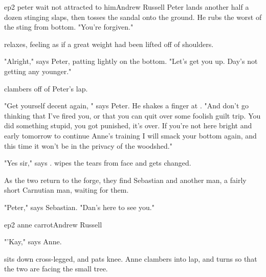 \documentclass{book}
\begin{document}
\begin{childnode}{ep2 peter wait not attracted to him}{Andrew Russell}
    Peter lands another half a dozen stinging slaps, then tosses the sandal onto the ground. He rubs the worst of the sting from \names{} bottom. "You're forgiven."

    \name{} relaxes, feeling as if a great weight had been lifted off of \hisher{} shoulders.

    "Alright," says Peter, patting \name{} lightly on the bottom. "Let's get you up. Day's not getting any younger."

    \name{} clambers off of Peter's lap.

    "Get yourself decent again, " says Peter. He shakes a finger at \name{}. "And don't go thinking that I've fired you, or that you can quit over some foolish guilt trip.
    You did something stupid, you got punished, it's over. If you're not here bright and early tomorrow to continue Anne's training I will smack your bottom again, and this time it won't be in the 
    privacy of the woodshed."

    "Yes sir," says \name{}. \HeShe{} wipes the tears from \hisher{} face and gets changed.

    As the two return to the forge, they find Sebastian and another man, a fairly short Carnutian man, waiting for them.

    "Peter," says Sebastian. "Dan's here to see you."


\end{childnode}
\begin{childnode}{ep2 anne carrot}{Andrew Russell}

    "'Kay," says Anne. 

    \name{} sits down cross-legged, and pats \hisher{} knee. Anne clambers into \names{} lap, and turns so that the two are facing the small tree.


\end{childnode}
\end{document}
